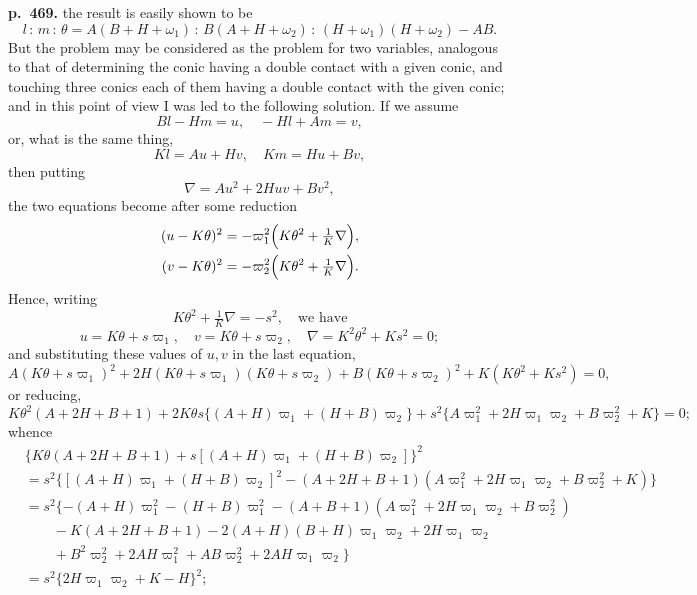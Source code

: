 \documentclass[11pt]{article}
\begin{document}
\bigskip
\noindent\textbf{p.~469.} the result is easily shown to be
\[ l\,:\,m\,:\,\theta = A(B + H + \omega_1)\,:\,B(A + H + \omega_2)\,:\,(H + \omega_1)(H + \omega_2) - AB. \]
But the problem may be considered as the problem for two variables, analogous to that of determining the conic having a double contact with a given conic, and touching three conics each of them having a double contact with the given conic; and in this point of view I was led to the following solution. If we assume
\[ Bl - Hm = u,\quad -Hl + Am = v, \]
or, what is the same thing,
\[ Kl = Au + Hv,\quad Km = Hu + Bv, \]
then putting
\[ \nabla = Au^2 + 2Huv + Bv^2, \]
the two equations become after some reduction
\[
\begin{aligned}
(u - K\theta)^2 &= -\varpi_1^2\Bigl(K\theta^2 + \tfrac{1}{K}\nabla\Bigr),\\
(v - K\theta)^2 &= -\varpi_2^2\Bigl(K\theta^2 + \tfrac{1}{K}\nabla\Bigr).
\end{aligned}
\]
Hence, writing
\[ K\theta^2 + \tfrac{1}{K}\nabla = -s^2,\quad \text{we have} \]
\[ u = K\theta + s\varpi_1,\quad v = K\theta + s\varpi_2,\quad \nabla = K^2\theta^2 + K s^2 = 0; \]
and substituting these values of $u, v$ in the last equation,
\[ A(K\theta + s\varpi_1)^2 + 2H(K\theta + s\varpi_1)(K\theta + s\varpi_2) + B(K\theta + s\varpi_2)^2 + K(K\theta^2 + Ks^2) = 0, \]
or reducing,
\[ K\theta^2(A + 2H + B + 1) + 2K\theta s\{(A + H)\varpi_1 + (H + B)\varpi_2\} + s^2\{A\varpi_1^2 + 2H\varpi_1 \varpi_2 + B\varpi_2^2 + K\} = 0; \]
whence
\[
\begin{aligned}
&\{K\theta(A + 2H + B + 1) + s[(A + H)\varpi_1 + (H + B)\varpi_2]\}^2\\
&= s^2\{[(A + H)\varpi_1 + (H + B)\varpi_2]^2 - (A + 2H + B + 1)(A\varpi_1^2 + 2H\varpi_1\varpi_2 + B\varpi_2^2 + K)\}\\
&= s^2\{- (A + H)\varpi_1^2 - (H + B)\varpi_1^2 - (A + B + 1)(A\varpi_1^2 + 2H\varpi_1\varpi_2 + B\varpi_2^2)\\
&\qquad - K(A + 2H + B + 1) - 2(A + H)(B + H)\varpi_1\varpi_2 + 2H\varpi_1\varpi_2\\
&\qquad + B^2\varpi_2^2 + 2A H\varpi_1^2 + AB\varpi_2^2 + 2AH\varpi_1\varpi_2\}\\
&= s^2\{2H\varpi_1\varpi_2 + K - H\}^2;
\end{aligned}
\]
\end{document}
